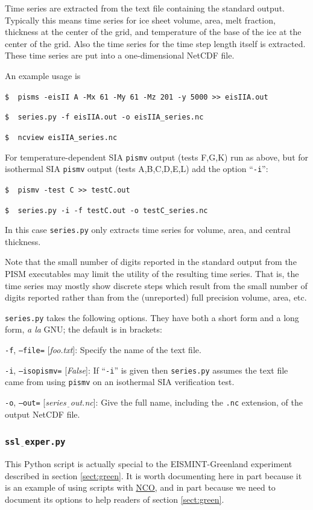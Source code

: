 \documentclass[11pt,final]{amsart}
\newcommand{\optoptdef}[3]{\vspace{1mm}\noindent \large\texttt{-#1},\,\,\texttt{--#2=}\normalsize\,\,[\textsl{#3}]:\quad}
\newcommand{\und}{$\underline{\,\,\,}$}
\begin{document}
Time series are extracted from the text file containing the standard output.  Typically this means time series for ice sheet volume, area, melt fraction, thickness at the center of the grid, and temperature of the base of the ice at the center of the grid.  Also the time series for the time step length itself is extracted.  These time series are put into a one-dimensional NetCDF file.

An example usage is

\verb|$  pisms -eisII A -Mx 61 -My 61 -Mz 201 -y 5000 >> eisIIA.out|

\verb|$  series.py -f eisIIA.out -o eisIIA_series.nc|

\verb|$  ncview eisIIA_series.nc|

For temperature-dependent SIA \verb|pismv| output (tests F,G,K) run as above, but for isothermal SIA \verb|pismv| output (tests A,B,C,D,E,L) add the option ``\verb|-i|'':

\verb|$  pismv -test C >> testC.out|

\verb|$  series.py -i -f testC.out -o testC_series.nc|

\noindent In this case \verb|series.py| only extracts time series for volume, area, and central thickness.

Note that the small number of digits reported in the standard output from the PISM executables may limit the utility of the resulting time series.  That is, the time series may mostly show discrete steps which result from the small number of digits reported rather than from the (unreported) full precision volume, area, etc.

\verb|series.py| takes the following options.  They have both a short form and a long form, \emph{a la} GNU; the default is in brackets:

\optoptdef{f}{file}{foo.txt} Specify the name of the text file.

\optoptdef{i}{isopismv}{False} If ``\verb|-i|'' is given then \verb|series.py| assumes the text file came from using \verb|pismv| on an isothermal SIA verification test.

\optoptdef{o}{out}{series\und out.nc} Give the full name, including the \verb|.nc| extension, of the output NetCDF file.



\subsubsection*{\Large{\texttt{ssl\und exper.py}}}  This Python script is actually special to the EISMINT-Greenland experiment described in section \ref{sect:green}.  It is worth documenting here in part because it is an example of using scripts with \href{http://nco.sourceforge.net/}{NCO}, and in part because we need to document its options to help readers of section \ref{sect:green}.
\end{document}
